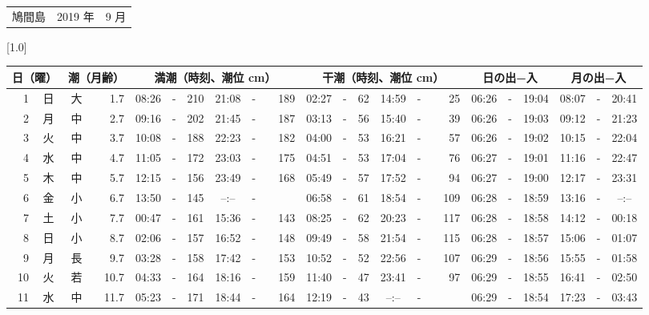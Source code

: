 \documentclass[12pt,a4j]{jsarticle}
\begin{document}
 \begin{table}[htbp]
 \begin{center}
 \begin{tabular}{lcc}
 \LARGE{鳩間島}  & \large{2019 年} & \large{ 9 月} \\
 \end{tabular}
 \end{center}
 \begin{center}
    \scalebox{0.7}[1.0]{
    \begin{tabular}{|rc|cr|ccrccr|ccrccr|ccc|ccc|}
    \hline
    \multicolumn{2}{|c|}{日（曜）} & \multicolumn{2}{c|}{潮（月齢）} & \multicolumn{6}{c|}{満潮（時刻、潮位 cm）} & \multicolumn{6}{c|}{干潮（時刻、潮位 cm）} & \multicolumn{3}{c|}{日の出−入} &  \multicolumn{3}{c|}{月の出−入}\\
 \hline
 1 & 日 & 大 &  1.7 &  08:26 &-& 210 &  21:08 &-& 189 &  02:27 &-&  62 &  14:59 &-&  25 & 06:26 & -& 19:04 & 08:07 & -& 20:41 \\
 2 & 月 & 中 &  2.7 &  09:16 &-& 202 &  21:45 &-& 187 &  03:13 &-&  56 &  15:40 &-&  39 & 06:26 & -& 19:03 & 09:12 & -& 21:23 \\
 3 & 火 & 中 &  3.7 &  10:08 &-& 188 &  22:23 &-& 182 &  04:00 &-&  53 &  16:21 &-&  57 & 06:26 & -& 19:02 & 10:15 & -& 22:04 \\
 4 & 水 & 中 &  4.7 &  11:05 &-& 172 &  23:03 &-& 175 &  04:51 &-&  53 &  17:04 &-&  76 & 06:27 & -& 19:01 & 11:16 & -& 22:47 \\
 5 & 木 & 中 &  5.7 &  12:15 &-& 156 &  23:49 &-& 168 &  05:49 &-&  57 &  17:52 &-&  94 & 06:27 & -& 19:00 & 12:17 & -& 23:31 \\
 6 & 金 & 小 &  6.7 &  13:50 &-& 145 &  --:-- &-&~~~~~ &  06:58 &-&  61 &  18:54 &-& 109 & 06:28 & -& 18:59 & 13:16 & -& --:-- \\
 7 & 土 & 小 &  7.7 &  00:47 &-& 161 &  15:36 &-& 143 &  08:25 &-&  62 &  20:23 &-& 117 & 06:28 & -& 18:58 & 14:12 & -& 00:18 \\
 8 & 日 & 小 &  8.7 &  02:06 &-& 157 &  16:52 &-& 148 &  09:49 &-&  58 &  21:54 &-& 115 & 06:28 & -& 18:57 & 15:06 & -& 01:07 \\
 9 & 月 & 長 &  9.7 &  03:28 &-& 158 &  17:42 &-& 153 &  10:52 &-&  52 &  22:56 &-& 107 & 06:29 & -& 18:56 & 15:55 & -& 01:58 \\
10 & 火 & 若 & 10.7 &  04:33 &-& 164 &  18:16 &-& 159 &  11:40 &-&  47 &  23:41 &-&  97 & 06:29 & -& 18:55 & 16:41 & -& 02:50 \\
11 & 水 & 中 & 11.7 &  05:23 &-& 171 &  18:44 &-& 164 &  12:19 &-&  43 &  --:-- &-&~~~~~ & 06:29 & -& 18:54 & 17:23 & -& 03:43 \\

\end{tabular}}
\end{center}
\end{table}
\end{document}
